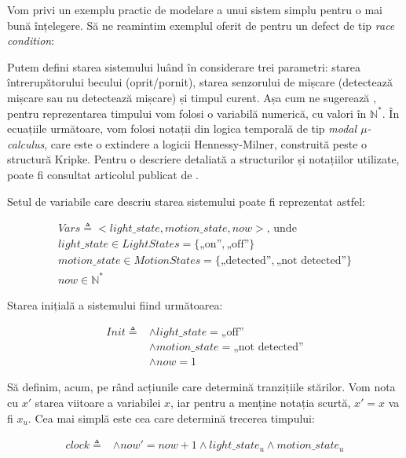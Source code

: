 Vom privi un exemplu practic de modelare a unui sistem simplu pentru o mai bună înțelegere. Să ne reamintim exemplul oferit de \citet{Zhou2021} pentru un defect de tip \textit{race condition}:


Putem defini starea sistemului luând în considerare trei parametri: starea întrerupătorului becului (oprit/pornit), starea senzorului de mișcare (detectează mișcare sau nu detectează mișcare) și timpul curent. Așa cum ne sugerează \citet{Lamport2005}, pentru reprezentarea timpului vom folosi o variabilă numerică, cu valori în $\mathbb{N}^*$. În ecuațiile următoare, vom folosi notații din logica temporală de tip \textit{modal $\mu$-calculus}, care este o extindere a logicii Hennessy-Milner, construită peste o structură Kripke. Pentru o descriere detaliată a structurilor și notațiilor utilizate, poate fi consultat articolul publicat de \citet{Markus1999}.

Setul de variabile care descriu starea sistemului poate fi reprezentat astfel:

\begin{gather*}
    Vars \triangleq <light\_state, motion\_state, now> \text{, unde } \\
        light\_state \in LightStates = \{\text{„on”}, \text{„off”}\} \\
        motion\_state \in MotionStates = \{\text{„detected”}, \text{„not detected”}\} \\
        now \in \mathbb{N}^*
\end{gather*}

Starea inițială a sistemului fiind următoarea:

\begin{align*}
    Init \triangleq &\wedge light\_state = \text{„off”} \\
                   &\wedge motion\_state = \text{„not detected”} \\
                   &\wedge now = 1
\end{align*}

Să definim, acum, pe rând acțiunile care determină tranzițiile stărilor. Vom nota cu $x'$ starea viitoare a variabilei $x$, iar pentru a menține notația scurtă, $x' = x$ va fi $x_u$. Cea mai simplă este cea care determină trecerea timpului:

\begin{align*}
    clock \triangleq &\wedge now' = now + 1 \wedge light\_state_u \wedge motion\_state_u
\end{align*}

